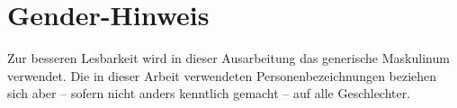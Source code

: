 \vspace*{3cm} %
\section*{Gender-Hinweis} %
Zur besseren Lesbarkeit wird in dieser Ausarbeitung das generische Maskulinum verwendet.
Die in dieser Arbeit verwendeten Personenbezeichnungen beziehen sich aber – sofern nicht anders kenntlich gemacht – auf
alle Geschlechter.
\clearpage
\ihead{\large{\textsc{\titel}}\\ \small{\untertitel} \\[2ex] \textit{\headmark}} %